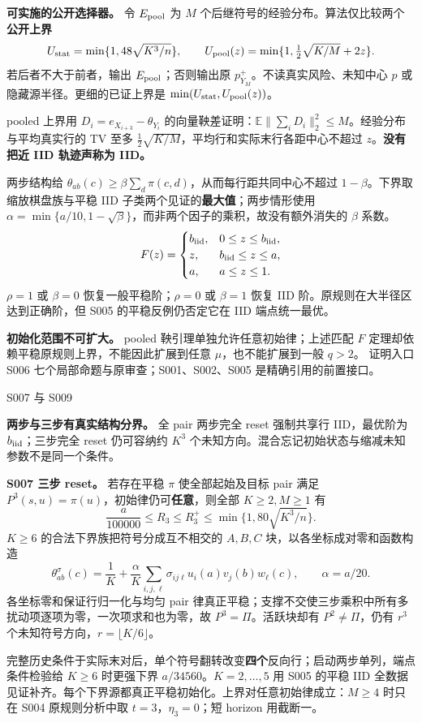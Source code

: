 \documentclass[11pt,a4paper]{article}
\renewcommand{\emph}[1]{\textbf{#1}}
\newcommand{\E}{\mathbb E}
\newcommand{\head}[2]{\begin{center}{\large\sffamily\color{ink}#1}\end{center}\vspace{-4pt}{\LARGE\bfseries #2}\par\vspace{5pt}}
\newcommand{\entry}[1]{\vfill\noindent\small\textcolor{ink}{证明入口}\quad#1\normalsize}
\begin{document}
\textbf{可实施的公开选择器。} 令 $E_{\rm pool}$ 为 $M$ 个后继符号的经验分布。算法仅比较两个\emph{公开上界}
\[
 U_{\rm stat}=\min\{1,48\sqrt{K^3/n}\},\qquad
 U_{\rm pool}(z)=\min\{1,\tfrac12\sqrt{K/M}+2z\}.
\]
若后者不大于前者，输出 $E_{\rm pool}$；否则输出原 $p^+_{Y_M}$。不读真实风险、未知中心 $p$ 或隐藏源半径。更细的已证上界是 $\min(U_{\rm stat},U_{\rm pool}(z))$。

pooled 上界用 $D_i=e_{X_{i+3}}-\theta_{Y_i}$ 的向量鞅差证明：$\E\|\sum_iD_i\|_2^2\le M$。经验分布与平均真实行的 TV 至多 $\tfrac12\sqrt{K/M}$，平均行和实际末行各距中心不超过 $z$。\textbf{没有把近 IID 轨迹声称为 IID。}

两步结构给 $\theta_{ab}(c)\ge\beta\sum_d\pi(c,d)$，从而每行距共同中心不超过 $1-\beta$。下界取缩放棋盘族与平稳 IID 子类两个见证的\emph{最大值}；两步情形使用 $\alpha=\min\{a/10,1-\sqrt\beta\}$，而非两个因子的乘积，故没有额外消失的 $\beta$ 系数。
\[
 F(z)=\begin{cases}
 b_{\rm iid},&0\le z\le b_{\rm iid},\\
 z,&b_{\rm iid}\le z\le a,\\
 a,&a\le z\le1.
 \end{cases}
\]
$\rho=1$ 或 $\beta=0$ 恢复一般平稳阶；$\rho=0$ 或 $\beta=1$ 恢复 IID 阶。原规则在大半径区达到正确阶，但 S005 的平稳反例仍否定它在 IID 端点统一最优。

\textbf{初始化范围不可扩大。} pooled 鞅引理单独允许任意初始律；上述匹配 $F$ 定理却依赖平稳原规则上界，不能因此扩展到任意 $\mu$，也不能扩展到一般 $q>2$。
\entry{S006 七个局部命题与原审查；S001、S002、S005 是精确引用的前置接口。}
\newpage
\head{S007 与 S009}{精确遗忘不等于 IID 统计维度}
\textbf{两步与三步有真实结构分界。} 全 pair 两步完全 reset 强制共享行 IID，最优阶为 $b_{\rm iid}$；三步完全 reset 仍可容纳约 $K^3$ 个未知方向。混合忘记初始状态与缩减未知参数不是同一个条件。

\textbf{S007 三步 reset。} 若存在平稳 $\pi$ 使全部起始及目标 pair 满足 $P^3(s,u)=\pi(u)$，初始律仍可\textbf{任意}，则全部 $K\ge2,M\ge1$ 有
\[
 \frac a{100000}\le R_3\le R_3^+
 \le\min\{1,80\sqrt{K^3/n}\}.
\]
$K\ge6$ 的合法下界族把符号分成互不相交的 $A,B,C$ 块，以各坐标成对零和函数构造
\[
 \theta_{ab}^{\sigma}(c)=\frac1K+
 \frac\alpha K\sum_{i,j,\ell}\sigma_{ij\ell}u_i(a)v_j(b)w_\ell(c),
 \qquad\alpha=a/20.
\]
各坐标零和保证行归一化与均匀 pair 律真正平稳；支撑不交使三步乘积中所有多扰动项逐项为零，一次项求和也为零，故 $P^3=\Pi$。活跃块却有 $P^2\ne\Pi$，仍有 $r^3$ 个未知符号方向，$r=\lfloor K/6\rfloor$。

完整历史条件于实际末对后，单个符号翻转改变\textbf{四个}反向行；启动两步单列，端点条件检验给 $K\ge6$ 时更强下界 $a/34560$。$K=2,\ldots,5$ 用 S005 的平稳 IID 全数据见证补齐。每个下界源都真正平稳初始化。上界对任意初始律成立：$M\ge4$ 时只在 S004 原规则分析中取 $t=3$，$\eta_3=0$；短 horizon 用截断一。
\end{document}
